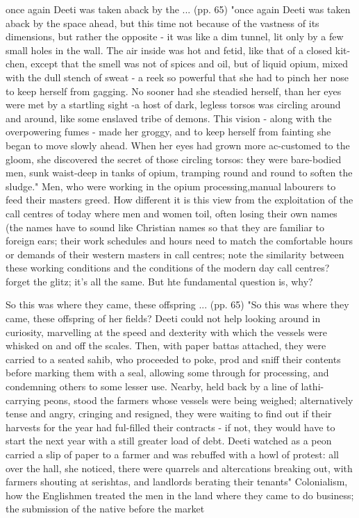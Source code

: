 once again Deeti was taken aback by the ... (pp. 65)
"once again Deeti was taken aback by the space ahead, but this time not because of the vastness of its dimensions, but rather the opposite - it was like a dim tunnel, lit only by a few small holes in the wall. The air inside was hot and fetid, like that of a closed kit-chen, except that the smell was not of spices and oil, but of liquid opium, mixed with the dull stench of sweat - a reek so powerful that she had to pinch her nose to keep herself from gagging. No sooner had she steadied herself, than her eyes were met by a startling sight -a host of dark, legless torsos was circling around and around, like some enslaved tribe of demons. This vision - along with the overpowering fumes - made her groggy, and to keep herself from fainting she began to move slowly ahead. When her eyes had grown more ac-customed to the gloom, she discovered the secret of those circling torsos: they were bare-bodied men, sunk waist-deep in tanks of opium, tramping round and round to soften the sludge."
Men, who were working in the opium processing,manual labourers to feed their masters greed. How different it is this view from the exploitation of the call centres of today where men and women toil, often losing their own names (the names have to sound like Christian names so that they are familiar to foreign ears; their work schedules and hours need to match the comfortable hours or demands of their western masters in call centres; note the similarity between these working conditions and the conditions of the modern day call centres? forget the glitz; it's all the same. But hte fundamental question is, why?

So this was where they came, these offspring ... (pp. 65)
"So this was where they came, these offspring of her fields? Deeti could not help looking around in curiosity, marvelling at the speed and dexterity with which the vessels were whisked on and off the scales. Then, with paper battas attached, they were carried to a seated sahib, who proceeded to poke, prod and sniff their contents before marking them with a seal, allowing some through for processing, and condemning others to some lesser use. Nearby, held back by a line of lathi-carrying peons, stood the farmers whose vessels were being weighed; alternatively tense and angry, cringing and resigned, they were waiting to find out if their harvests for the year had ful-filled their contracts - if not, they would have to start the next year with a still greater load of debt. Deeti watched as a peon carried a slip of paper to a farmer and was rebuffed with a howl of protest: all over the hall, she noticed, there were quarrels and altercations breaking out, with farmers shouting at serishtas, and landlords berating their tenants"
Colonialism, how the Englishmen treated the men in the land where they came to do business; the submission of the native before the market

